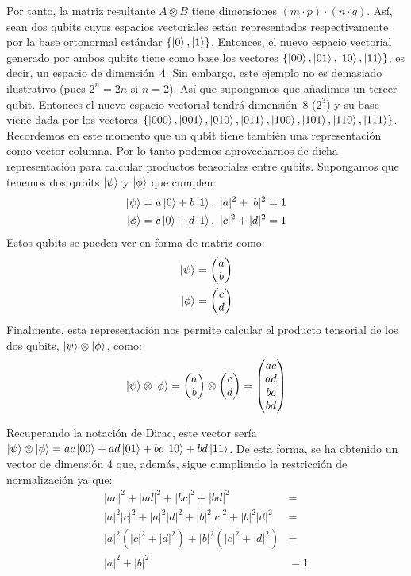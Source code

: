 Por tanto,  la matriz resultante $A\otimes B$ tiene dimensiones $(m\cdot p)\cdot  (n\cdot q)$. Así, sean dos qubits cuyos espacios vectoriales están representados respectivamente por la base ortonormal estándar $\{\left|0\right\rangle,\left|1\right\rangle\}$. Entonces, el nuevo espacio vectorial 
generado por ambos qubits tiene como base los vectores $\{\left|00\right\rangle,\left|01\right\rangle,\left|10\right\rangle,\left|11\right\rangle\}$, es decir, un espacio de dimensión~$4$. Sin embargo, este ejemplo no es demasiado ilustrativo (pues $2^n = 2n$ si $n=2$). Así que supongamos que añadimos un tercer qubit. Entonces el nuevo espacio vectorial tendrá dimensión~$8$ ($2^3$) y su base viene dada por los vectores $\{\left|000\right\rangle,\left|001\right\rangle,\left|010\right\rangle,\left|011\right\rangle,\left|100\right\rangle,\left|101\right\rangle,\left|110\right\rangle,\left|111\right\rangle\}$. Recordemos en este momento que un qubit tiene también una representación como vector columna. Por lo tanto podemos aprovecharnos de dicha representación para calcular  productos tensoriales entre qubits.
%
Supongamos que tenemos dos qubits $\left|\psi\right\rangle$ y $\left|\phi\right\rangle$ que cumplen:
\[
\begin{split}
\left|\psi\right\rangle=a\left|0\right\rangle+b\left|1\right\rangle,\ |a|^2 + |b|^2 = 1\\
\left|\phi\right\rangle=c\left|0\right\rangle+d\left|1\right\rangle,\ |c|^2 + |d|^2 = 1
\end{split}
\]
%
Estos qubits se pueden ver en forma de matriz como:
\[
\begin{split}
\left|\psi\right\rangle = \begin{pmatrix} a \\ b \end{pmatrix}\\
\left|\phi\right\rangle = \begin{pmatrix} c \\ d \end{pmatrix}
\end{split}
\]
%
Finalmente, esta representación nos permite calcular el producto tensorial de los dos qubits, $\left|\psi\right\rangle\otimes\left|\phi\right\rangle$, como:
$$
\left|\psi\right\rangle\otimes\left|\phi\right\rangle = \begin{pmatrix} a \\ b \end{pmatrix}\otimes\begin{pmatrix} c \\ d \end{pmatrix} = \begin{pmatrix} ac \\ ad \\ bc \\ bd  \end{pmatrix}
$$

Recuperando la notación de Dirac, este vector sería $\left|\psi\right\rangle\otimes\left|\phi\right\rangle = ac\left|00\right\rangle + ad\left|01\right\rangle + bc\left|10\right\rangle + bd\left|11\right\rangle$. De esta forma, se ha obtenido un vector de dimensión 4 que, además, sigue cumpliendo la restricción de normalización ya que:
\[
\begin{split}
|ac|^2 + |ad|^2 + |bc|^2 + |bd|^2 &= \\
|a|^2|c|^2 + |a|^2|d|^2 + |b|^2|c|^2 + |b|^2|d|^2 &= \\
|a|^2(|c|^2 + |d|^2) + |b|^2(|c|^2 + |d|^2) &= \\
|a|^2 + |b|^2 &= 1
\end{split}
\]

